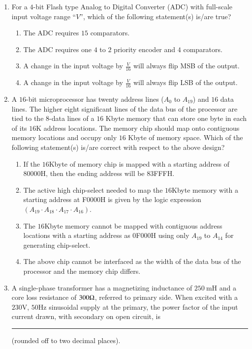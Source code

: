 \documentclass[journal,12pt,onecolumn]{IEEEtran}
\theoremstyle{remark}
\begin{document}
\begin{enumerate}
\item For a $4$-bit Flash type Analog to Digital Converter (ADC) with full-scale input voltage range ``$V$'', which of the following statement(s) is/are true? \par \hfill{}
\begin{enumerate}
\item The ADC requires $15$ comparators.
\item The ADC requires one $4$ to $2$ priority encoder and $4$ comparators.
\item A change in the input voltage by $\frac{V}{16}$ will always flip MSB of the output.
\item A change in the input voltage by $\frac{V}{16}$ will always flip LSB of the output.
\end{enumerate}

\item A $16$-bit microprocessor has twenty address lines ($A_0$ to $A_{19}$) and $16$ data lines. The higher eight significant lines of the data bus of the processor are tied to the 8-data lines of a $16$ Kbyte memory that can store one byte in each of its $16$K address locations. The memory chip should map onto contiguous memory locations and occupy only $16$ Kbyte of memory space. Which of the following statement(s) is/are correct with respect to the above design? \par \hfill{}
\begin{enumerate}
\item If the $16$Kbyte of memory chip is mapped with a starting address of $80000$H, then the ending address will be $83$FFFH.
\item The active high chip-select needed to map the $16$Kbyte memory with a starting address at F$0000$H is given by the logic expression $(A_{19} \cdot A_{18} \cdot A_{17} \cdot A_{16})$.
\item The $16$Kbyte memory cannot be mapped with contiguous address locations with a starting address as $0$F$000$H using only $A_{19}$ to $A_{14}$ for generating chip-select.
\item The above chip cannot be interfaced as the width of the data bus of the processor and the memory chip differs.
\end{enumerate}

\item A single-phase transformer has a magnetizing inductance of $250\ \text{mH}$ and a core loss resistance of $300\ohm$, referred to primary side. When excited with a $230\text{V}$, $50\text{Hz}$ sinusoidal supply at the primary, the power factor of the input current drawn, with secondary on open circuit, is\rule{1cm}{0.4pt} (rounded off to two decimal places).  \par \hfill{} 


\end{enumerate}
\end{document}
